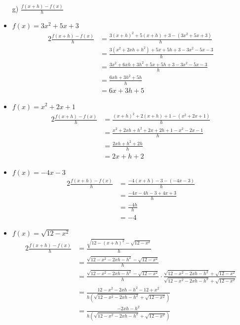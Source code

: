 \documentclass{templateNote}
\begin{document}
\begin{itemize}
    \item[g)] $\frac{f(x+h)-f(x)}{h}$
    \item $f(x) = 3x^2 + 5x + 3$
    \begin{alignat*}{2}
        \frac{f(x+h)-f(x)}{h} &= \frac{3(x + h)^2 + 5(x + h) + 3 - (3x^2 + 5x + 3)}{h} \\
        &= \frac{3(x^2 + 2xh + h^2) + 5x + 5h + 3 - 3x^2 - 5x - 3}{h} \\
        &= \frac{3x^2 + 6xh + 3h^2 + 5x + 5h + 3 - 3x^2 - 5x - 3}{h} \\
        &= \frac{6xh + 3h^2 + 5h}{h} \\
        &= 6x + 3h + 5
    \end{alignat*}
    \item $f(x) = x^2 + 2x + 1$
    \begin{alignat*}{2}
        \frac{f(x+h)-f(x)}{h} &= \frac{(x + h)^2 + 2(x + h) + 1 - (x^2 + 2x + 1)}{h} \\
        &= \frac{x^2 + 2xh + h^2 + 2x + 2h + 1 - x^2 - 2x - 1}{h} \\
        &= \frac{2xh + h^2 + 2h}{h} \\
        &= 2x + h + 2
    \end{alignat*}
    \item $f(x) = -4x - 3$
    \begin{alignat*}{2}
        \frac{f(x+h)-f(x)}{h} &= \frac{-4(x + h) - 3 - (-4x - 3)}{h} \\
        &= \frac{-4x - 4h - 3 + 4x + 3}{h} \\
        &= \frac{-4h}{h} \\
        &= -4
    \end{alignat*}
    \item $f(x) = \sqrt{12 - x^2}$
    \begin{alignat*}{2}
        \frac{f(x+h)-f(x)}{h} &= \frac{\sqrt{12 - (x + h)^2} - \sqrt{12 - x^2}}{h} \\
        &= \frac{\sqrt{12 - x^2 - 2xh - h^2} - \sqrt{12 - x^2}}{h} \\
        &= \frac{\sqrt{12 - x^2 - 2xh - h^2} - \sqrt{12 - x^2}}{h} \cdot \frac{\sqrt{12 - x^2 - 2xh - h^2} + \sqrt{12 - x^2}}{\sqrt{12 - x^2 - 2xh - h^2} + \sqrt{12 - x^2}} \\
        &= \frac{12 - x^2 - 2xh - h^2 - 12 + x^2}{h(\sqrt{12 - x^2 - 2xh - h^2} + \sqrt{12 - x^2})} \\
        &= \frac{-2xh - h^2}{h(\sqrt{12 - x^2 - 2xh - h^2} + \sqrt{12 - x^2})} \\

\end{alignat*}
\end{itemize}
\end{document}
